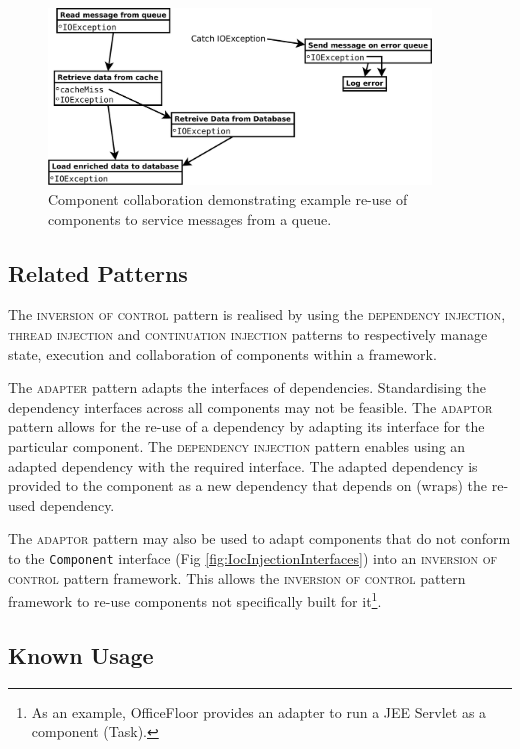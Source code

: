 \documentclass[prodmode]{style/acmlarge}
\begin{document}
\begin{figure}[t]
\centering
\includegraphics[width=4in]{IocReuseForQueue}
\caption{Component collaboration demonstrating example re-use of components to service messages from a queue.}
\label{fig:IocReuseForQueue}
\end{figure}


\subsection{Related Patterns}

The \textsc{inversion of control} pattern is realised by using the
\textsc{dependency injection}, \textsc{thread injection} and
\textsc{continuation injection} patterns to respectively manage state, execution
and collaboration of components within a framework.

The \textsc{adapter} pattern \cite{gof} adapts the interfaces of dependencies.
Standardising the dependency interfaces across all components may not be
feasible.  The \textsc{adaptor} pattern allows for the re-use of a dependency by
adapting its interface for the particular component.  The \textsc{dependency
injection} pattern enables using an adapted dependency with the required
interface.  The adapted dependency is provided to the component as a new
dependency that depends on (wraps) the re-used dependency.

The \textsc{adaptor} pattern may also be used to adapt components that do not
conform to the \texttt{Component} interface (Fig
\ref{fig:IocInjectionInterfaces}) into an \textsc{inversion of control} pattern
framework.  This allows the \textsc{inversion of control} pattern framework to re-use
components not specifically built for it\footnote{As an example, OfficeFloor
\cite{officefloor} provides an adapter to run a JEE Servlet as a component
(Task).}.


\subsection{Known Usage}
\end{document}
